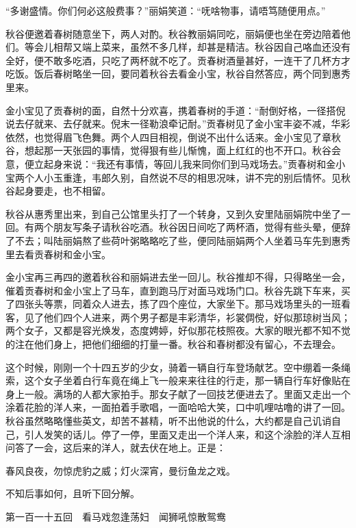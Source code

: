 \documentclass[12pt,UTF8]{ctexbook}
\begin{document}
{{{“多谢盛情。你们何必这般费事？”丽娟笑道：“呒啥物事，请唔笃随便用点。”

秋谷便邀着春树随意坐下，两人对酌。秋谷教丽娟同吃，丽娟便也坐在旁边陪着他们。等会儿相帮又端上菜来，虽然不多几样，却甚是精洁。秋谷因自己咯血还没有全好，便不敢多吃酒，只吃了两杯就不吃了。贡春树酒量甚好，一连干了几杯方才吃饭。饭后春树略坐一回，要同着秋谷去看金小宝，秋谷自然答应，两个同到惠秀里来。

金小宝见了贡春树的面，自然十分欢喜，携着春树的手道：“耐倒好格，一径搭倪说去仔就来、去仔就来。倪末一径勒浪牵记耐。”贡春树见了金小宝丰姿不减，华彩依然，也觉得眉飞色舞。两个人四目相视，倒说不出什么话来。金小宝见了章秋谷，想起那一天张园的事情，觉得狠有些儿惭愧，面上红红的也不开口。秋谷会意，便立起身来说：“我还有事情，等回儿我来同你们到马戏场去。”贡春树和金小宝两个人小玉重逢，韦郎久别，自然说不尽的相思况味，讲不完的别后情怀。见秋谷起身要走，也不相留。

秋谷从惠秀里出来，到自己公馆里头打了一个转身，又到久安里陆丽娟院中坐了一回。有两个朋友写条子请秋谷吃酒。秋谷因日间吃了两杯酒，觉得有些头晕，便辞了不去；叫陆丽娟熬了些荷叶粥略略吃了些，便同陆丽娟两个人坐着马车先到惠秀里去看贡春树和金小宝。

金小宝再三再四的邀着秋谷和丽娟进去坐一回儿。秋谷推却不得，只得略坐一会，催着贡春树和金小宝上了马车，直到跑马厅对面马戏场门口。秋谷先跳下车来，买了四张头等票，同着众人进去，拣了四个座位，大家坐下。那马戏场里头的一班看客，见了他们四个人进来，两个男子都是丰彩清华，衫裳倜傥，好似那琼树当风；两个女子，又都是容光焕发，态度娉婷，好似那花枝照夜。大家的眼光都不知不觉的注在他们身上，把他们细细的打量一番。秋谷和春树都没有留心，不去理会。

这个时候，刚刚一个十四五岁的少女，骑着一辆自行车登场献艺。空中绷着一条绳索，这个女子坐着白行车竟在绳上飞一般来来往往的行走，那一辆自行车好像贴在身上一般。满场的人都大家拍手。那女子献了一回技艺便进去了。里面又走出一个涂着花脸的洋人来，一面拍着手歌唱，一面哈哈大笑，口中叽哩咕噜的讲了一回。秋谷虽然略略懂些英文，却苦不甚精，听不出他说的什么，大约都是自己讥诮自己，引人发笑的话儿。停了一停，里面又走出一个洋人来，和这个涂脸的洋人互相问答了一会，这后来的洋人，就去伏在地上。正是：

春风良夜，勿惊虎豹之威；灯火深宵，曼衍鱼龙之戏。

不知后事如何，且听下回分解。





第一百一十五回　看马戏忽逢荡妇　闻狮吼惊散鸳鸯





}}}
\end{document}
